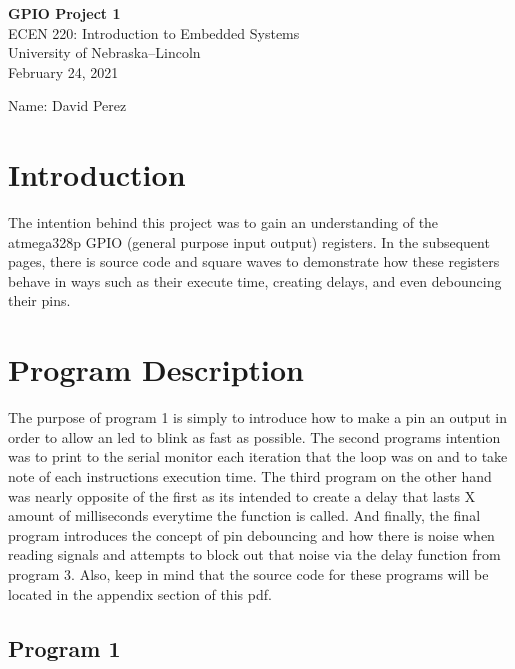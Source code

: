 \documentclass[11pt,pdftex,portrait,letterpaper]{article}
\begin{document}
\vspace*{30ex}
\begin{center}

\textbf{GPIO Project 1}\\

\vspace{4ex}
ECEN 220: Introduction to Embedded Systems\\
University of Nebraska--Lincoln\\
February 24, 2021

\vspace{4ex}
Name: David Perez\\

\end{center}


\pagebreak
\tableofcontents
\pagebreak


\section{Introduction}

The intention behind this project was to gain an understanding of the atmega328p GPIO (general purpose input output) registers. In the subsequent pages, there is source code and square waves to demonstrate how these  registers behave in ways such as their execute time, creating delays, and even debouncing their pins.
 
\section{Program Description}

The purpose of program 1 is simply to introduce how to make a pin an output in order to allow an led to blink as fast as possible. The second programs intention was to print to the serial monitor each iteration that the loop was on and to take note of each instructions execution time. The third program on the other hand was nearly opposite of the first as its intended to create a delay that lasts X amount of milliseconds everytime the function is called. And finally, the final program introduces the concept of pin debouncing and how there is noise when reading  signals and attempts to block out that noise via the delay function from program 3. Also, keep in mind that the source code for these programs will be located in the appendix section of this pdf.

\subsection{Program 1}
\end{document}
